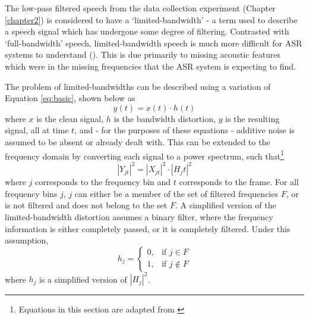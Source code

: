The low-pass filtered speech from the data collection experiment (Chapter \ref{chapter2}) is considered to have a `limited-bandwidth' - a term used to describe a speech signal which has undergone some degree of filtering.  Contrasted with `full-bandwidth' speech, limited-bandwidth speech is much more difficult for ASR systems to understand (\cite{morales:09}). This is due primarily to missing acoustic features which were in the missing frequencies that the ASR system is expecting to find.

The problem of limited-bandwidths can be described using a variation of Equation \ref{eq:basic}, shown below as \begin{equation} y(t) = x(t) \cdot h(t) \end{equation} where $x$ is the clean signal, $h$ is the bandwidth distortion, $y$ is the resulting signal, all at time $t$, and - for the purposes of these equations - additive noise is assumed to be absent or already dealt with.  This can be extended to the frequency domain by converting each signal to a power spectrum, such that\footnote{Equations in this section are adapted from \cite{morales:09}} \begin{equation} |Y_{jt}|^2 = |X_{jt}|^2 \cdot |H_jt|^2 \end{equation} where $j$ corresponds to the frequency bin and $t$ corresponds to the frame.  For all frequency bins $j$, $j$ can either be a member of the set of filtered frequencies $F$, or is not filtered and does not belong to the set $F$.  A simplified version of the limited-bandwidth distortion assumes a binary filter, where the frequency information is either completely passed, or it is completely filtered.  Under this assumption, \[ h_j= \begin{cases} 0,& \text{if }  j \in F \\ 1,& \text{if }  j \notin F \end{cases} \] where $h_j$ is a simplified version of $|H_j|^2$.

